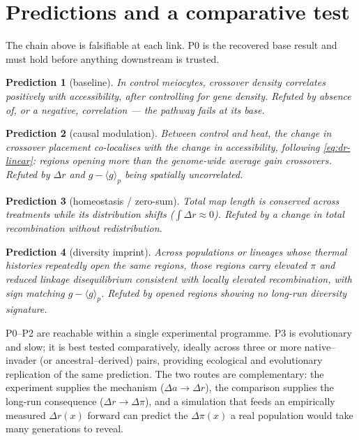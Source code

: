 \documentclass[11pt]{article}
\newtheorem{prediction}{Prediction}
\theoremstyle{remark}
\newcommand{\avg}[1]{\langle #1 \rangle}
\begin{document}
\section{Predictions and a comparative test}
\label{sec:predictions}

The chain above is falsifiable at each link. P0 is the recovered base result and
must hold before anything downstream is trusted.

\begin{prediction}[baseline]
In control meiocytes, crossover density correlates positively with accessibility,
after controlling for gene density. \emph{Refuted by} absence of, or a negative,
correlation --- the pathway fails at its base.
\end{prediction}
\begin{prediction}[causal modulation]
Between control and heat, the change in crossover placement co-localises with the
change in accessibility, following \eqref{eq:dr-linear}: regions opening more than
the genome-wide average gain crossovers. \emph{Refuted by} $\Delta r$ and
$g-\avg{g}_p$ being spatially uncorrelated.
\end{prediction}
\begin{prediction}[homeostasis / zero-sum]
Total map length is conserved across treatments while its distribution shifts
($\int\Delta r \approx 0$). \emph{Refuted by} a change in total recombination
without redistribution.
\end{prediction}
\begin{prediction}[diversity imprint]
Across populations or lineages whose thermal histories repeatedly open the same
regions, those regions carry elevated $\pi$ and reduced linkage disequilibrium
consistent with locally elevated recombination, with sign matching
$g-\avg{g}_p$. \emph{Refuted by} opened regions showing no long-run diversity
signature.
\end{prediction}

P0--P2 are reachable within a single experimental programme. P3 is evolutionary
and slow; it is best tested comparatively, ideally across three or more
native--invader (or ancestral--derived) pairs, providing ecological and
evolutionary replication of the same prediction. The two routes are complementary:
the experiment supplies the mechanism ($\Delta a \to \Delta r$), the comparison
supplies the long-run consequence ($\Delta r \to \Delta\pi$), and a simulation
that feeds an empirically measured $\Delta r(x)$ forward can predict the
$\Delta\pi(x)$ a real population would take many generations to reveal.
\end{document}
